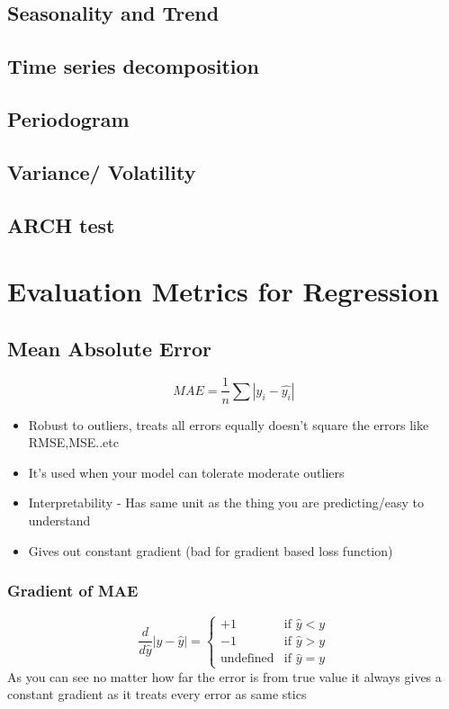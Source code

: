 \documentclass[12pt]{extarticle}
\begin{document}
\subsection*{Seasonality and Trend}
\subsection{Time series decomposition}
\subsection{Periodogram}
\subsection*{Variance/ Volatility}
\subsection{ARCH test}




\section{Evaluation Metrics for Regression}

\subsection{Mean Absolute Error}  

$$MAE = \frac{1}{n}\sum{|y_i - \hat{y_i}|}$$ 
\begin{itemize}
    \item Robust to outliers, treats all errors equally doesn’t square the errors like RMSE,MSE..etc 
    \item It’s used when your model can tolerate moderate outliers  
    \item Interpretability - Has same unit as the thing you are predicting/easy to understand 
    \item Gives out constant gradient (bad for gradient based loss function) 
\end{itemize}
 
\subsubsection{Gradient of MAE} 
$$
\frac{d}{d\hat{y}}|y - \hat{y}| = 
\begin{cases} 
+1 & \text{if }  \hat{y} < y \\ 
-1 & \text{if }  \hat{y} > y \\ 
\text{undefined} & \text{if } \hat{y} = y 
\end{cases} 
$$
As you can see no matter how far the error is from true value it always gives a constant gradient as it treats every error as same
stics
\end{document}
